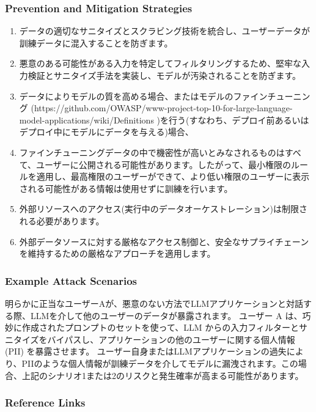 \documentclass[
]{article}
\providecommand{\tightlist}{%
  \setlength{\itemsep}{0pt}\setlength{\parskip}{0pt}}
\begin{document}
\subsubsection{Prevention and Mitigation
Strategies}\label{prevention-and-mitigation-strategies}

\begin{enumerate}
\def\labelenumi{\arabic{enumi}.}
\tightlist
\item
  データの適切なサニタイズとスクラビング技術を統合し、ユーザーデータが訓練データに混入することを防ぎます。
\item
  悪意のある可能性がある入力を特定してフィルタリングするため、堅牢な入力検証とサニタイズ手法を実装し、モデルが汚染されることを防ぎます。
\item
  データによりモデルの質を高める場合、またはモデルのファインチューニング
  (https://github.com/OWASP/www-project-top-10-for-large-language-model-applications/wiki/Definitions
  )を行う(すなわち、デプロイ前あるいはデプロイ中にモデルにデータを与える)場合、
\item
  ファインチューニングデータの中で機密性が高いとみなされるものはすべて、ユーザーに公開される可能性があります。したがって、最小権限のルールを適用し、最高権限のユーザーができて、より低い権限のユーザーに表示される可能性がある情報は使用せずに訓練を行います。
\item
  外部リソースへのアクセス(実行中のデータオーケストレーション)は制限される必要があります。
\item
  外部データソースに対する厳格なアクセス制御と、安全なサプライチェーンを維持するための厳格なアプローチを適用します。
\end{enumerate}

\subsubsection{Example Attack Scenarios}\label{example-attack-scenarios}

明らかに正当なユーザーAが、悪意のない方法でLLMアプリケーションと対話する際、LLMを介して他のユーザーのデータが暴露されます。
ユーザー A は、巧妙に作成されたプロンプトのセットを使って、LLM
からの入力フィルターとサニタイズをバイパスし、アプリケーションの他のユーザーに関する個人情報
(PII) を暴露させます。
ユーザー自身またはLLMアプリケーションの過失により、PIIのような個人情報が訓練データを介してモデルに漏洩されます。この場合、上記のシナリオ1または2のリスクと発生確率が高まる可能性があります。

\subsubsection{Reference Links}\label{reference-links}
\end{document}
